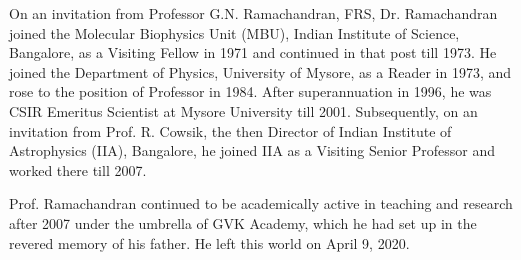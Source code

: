 On an invitation from Professor G.N. Ramachandran, FRS, Dr. Ramachandran joined the Molecular Biophysics Unit (MBU), Indian Institute of Science, Bangalore, as a Visiting Fellow in 1971 and continued in that post till 1973. He joined the Department of Physics, University of Mysore, as a Reader in 1973, and rose to the position of Professor in 1984. After superannuation in 1996, he was CSIR Emeritus Scientist at Mysore University till 2001. Subsequently, on an invitation from Prof. R. Cowsik, the then Director of Indian Institute of Astrophysics (IIA), Bangalore, he joined IIA as a Visiting Senior Professor and worked there till 2007.
 
Prof. Ramachandran continued to be academically active in teaching and research after 2007 under the umbrella of GVK Academy, which he had set up in the revered memory of his father. He left this world on April 9, 2020.

